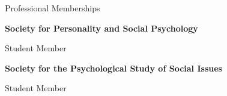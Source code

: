 \begin{rubric}{Professional Memberships}

\entry*[2010 {---} Present]
\textbf{Society for Personality and Social Psychology} \par
Student Member

\entry*[2011 {---} Present]
\textbf{Society for the Psychological Study of Social Issues} \par
Student Member

\end{rubric}
